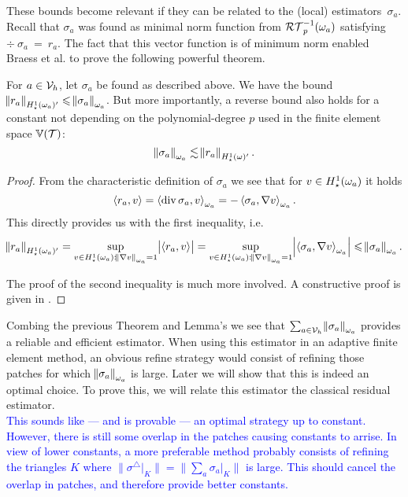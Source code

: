 \documentclass[thesis.tex]{subfiles}
\begin{document}
These bounds become relevant if they can be related to the (local) estimators~$\sigma_a$. Recall
that $\sigma_a$ was found as minimal norm function from $\mathcal{RT}_p^{-1}(\omega_a)$ satisfying $\div~\sigma_a~=~r_a$.
The fact that this vector function is of minimum norm enabled Braess et al. \cite{braessequilrobust} to prove the following powerful theorem.
\begin{thm}
  \label{thm:locresequiv}
  For $a \in \mathcal{V}_h$, let $\sigma_a$ be found as described above. 
  We have the bound $\norm{r_a}_{H_\star^1(\omega_a)'} \leqslant \norm{\sigma_a}_{\omega_a}$. But more importantly,
  a reverse bound also holds for a constant {not} depending on the polynomial-degree $p$ used in the finite element space $\mathbb{V}(\mathcal{T})$:
  \[
    \norm{\sigma_a}_{\omega_a} \lesssim \norm{r_a}_{H_\star^1(\omega)'}.
  \]
\end{thm}
\begin{proof}
  From the characteristic definition of $\sigma_a$ we see that for $v \in H_\star^1(\omega_a)$ it holds
  \[
    \left \langle r_a, v \right \rangle = \left \langle \operatorname{div} \sigma_a, v \right \rangle_{\omega_a} = - \left \langle \sigma_a, \nabla v \right \rangle_{\omega_a}.
  \]
  This directly provides us with the first inequality, i.e.
  \[
    \norm{r_a}_{H_\star^1(\omega_a)'} = \sup_{v \in H_\star^1(\omega_a) : \norm{\nabla v}_{\omega_a} = 1} \abs{\left \langle r_a, v \right \rangle} = \sup_{v \in H_\star^1(\omega_a) : \norm{\nabla v}_{\omega_a}=1} \abs{\left \langle \sigma_a, \nabla v \right \rangle_{\omega_a}} \leqslant \norm{\sigma_a}_{\omega_a}.
  \]

  The proof of the second inequality is much more involved. A constructive proof is given in \cite[Theorem~7]{braessequilrobust}.
\end{proof}
\begin{rem}
  Combing the previous Theorem and Lemma's we see that $\sum_{a \in \mathcal{V}_h} \norm{\sigma_a}_{\omega_a}$ provides a reliable and efficient estimator.
  When using this estimator in an adaptive finite element method, an obvious refine strategy would consist
  of refining those patches for which $\norm{\sigma_a}_{\omega_a}$ is large. Later we will show that this is indeed
  an optimal choice. To prove this, we will relate this estimator the classical residual estimator.
  \\
  \textcolor{blue}{
    This sounds like --- and is provable --- an optimal strategy up to constant. However, there is still some 
    overlap in the patches causing constants to arrise. In view of lower constants, a more preferable method probably consists of refining the triangles $K$
    where $\|{\sigma^\triangle|_{K}}\| =\|{\sum_{a} \sigma_a|_{K}}\|$ is large. This should cancel the overlap in patches,
    and therefore provide better constants.
  }
\end{rem}
\end{document}
